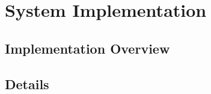\section{System Implementation}
\label{implementation}

\subsection{Implementation Overview}




\subsection{Details}



